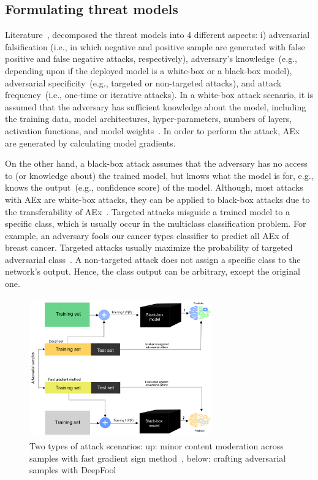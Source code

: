 \subsection{Formulating threat models}
Literature~\cite{yuan2019adversarial}, decomposed the threat models into 4 different aspects: i) adversarial falsification (i.e., in which negative and positive sample are generated with false positive and false negative attacks, respectively), adversary's knowledge~(e.g., depending upon if the deployed model is a white-box or a black-box model), adversarial specificity~(e.g., targeted or non-targeted attacks), and attack frequency~(i.e., one-time or iterative attacks). In a white-box attack scenario, it is assumed that the adversary has sufficient knowledge about the model, including the training data, model architectures, hyper-parameters, numbers of layers, activation functions, and model weights~\cite{yuan2019adversarial}. In order to perform the attack, AEx are generated by calculating model gradients. 

\hspace*{3.5mm} On the other hand, a black-box attack assumes that the adversary has no access to (or knowledge about) the trained model, but knows what the model is for, e.g., knows the output~(e.g., confidence score) of the model. Although, most attacks with AEx are white-box attacks, they can be applied to black-box attacks due to the transferability of AEx~\cite{papernot2016transferability}. Targeted attacks misguide a trained model to a specific class, which is usually occur in the multiclass classification problem. For example, an adversary fools our cancer types classifier to predict all AEx of breast cancer. Targeted attacks usually maximize the probability of targeted adversarial class~\cite{yuan2019adversarial}. A non-targeted attack does not assign a specific class to the network's output. Hence, the class output can be arbitrary, except the original one.

\begin{figure}[htp!]
    \centering
    \includegraphics[width=0.7\textwidth,height=60mm]{images/aattacks.png}
    \caption[Formulating adversarial threat model]{Two types of attack scenarios: up: minor content moderation across samples with fast gradient sign method~\cite{goodfellow2014explaining}, below: crafting adversarial samples with DeepFool}
    \label{fig:aattacks}
    \vspace{-2mm}
\end{figure}

